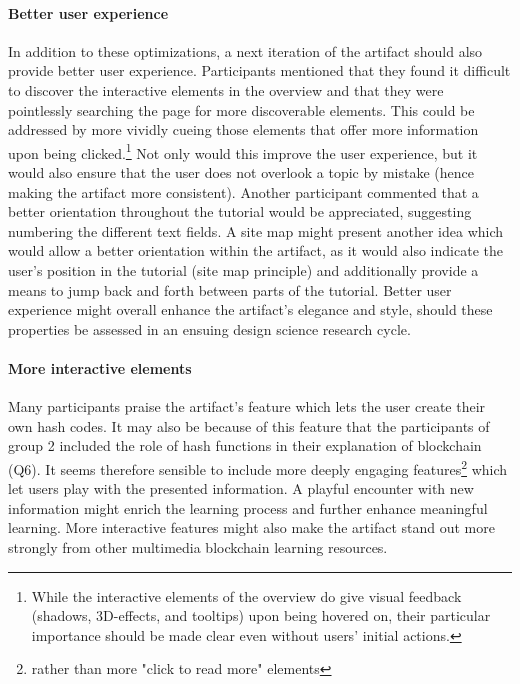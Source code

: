 \paragraph{Better user experience} In addition to these optimizations, a next iteration of the artifact should also provide better user experience. Participants mentioned that they found it difficult to discover the interactive elements in the overview and that they were pointlessly searching the page for more discoverable elements. This could be addressed by more vividly cueing those elements that offer more information upon being clicked.\footnote{While the interactive elements of the overview do give visual feedback (shadows, 3D-effects, and tooltips) upon being hovered on, their particular importance should be made clear even without users' initial actions.} Not only would this improve the user experience, but it would also ensure that the user does not overlook a topic by mistake (hence making the artifact more consistent). Another participant commented that a better orientation throughout the tutorial would be appreciated, suggesting numbering the different text fields. A site map might present another idea which would allow a better orientation within the artifact, as it would also indicate the user's position in the tutorial (site map principle) and additionally provide a means to jump back and forth between parts of the tutorial. Better user experience might overall enhance the artifact's elegance and style, should these properties be assessed in an ensuing design science research cycle. 

\paragraph{More interactive elements} Many participants praise the artifact's feature which lets the user create their own hash codes. It may also be because of this feature that the participants of group 2 included the role of hash functions in their explanation of blockchain (Q6). It seems therefore sensible to include more deeply engaging features\footnote{rather than more "click to read more" elements} which let users play with the presented information. A playful encounter with new information might enrich the learning process and further enhance meaningful learning. More interactive features might also make the artifact stand out more strongly from other multimedia blockchain learning resources. 

